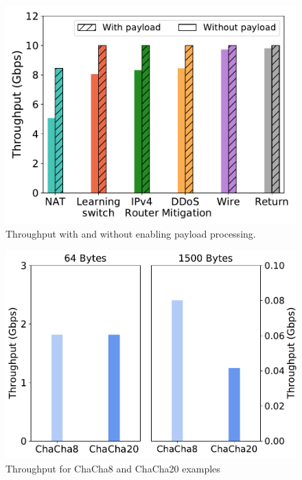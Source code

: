 \begin{figure}[th]
\centering
\includegraphics[width=.85\columnwidth]{figures/payload-1500B.pdf}
\caption{Throughput with and without enabling payload processing.}
\label{fig:payload-1500B}
\end{figure}

\begin{figure}[th]
\centering
\includegraphics[width=.8\linewidth]{figures/throughput_chacha.pdf}
\caption{Throughput for ChaCha8 and ChaCha20 examples}
\label{fig:chacha}
\end{figure}

